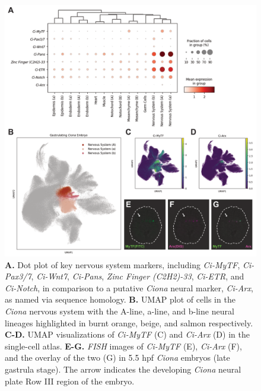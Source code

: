 \begin{figure}[p]
    \centering
    \includegraphics[scale=.7]{4_figures-and-files/Fig3_Arx-Neural-Markers.png}
    \caption[Vertebrate forebrain marker \textit{Arx} found in \textit{Ciona} A-line nervous system lineage]{\textbf{A.} Dot plot of key nervous system markers, including \textit{Ci-MyTF}, \textit{Ci-Pax3/7}, \textit{Ci-Wnt7}, \textit{Ci-Pans}, \textit{Zinc Finger (C2H2)-33}, \textit{Ci-ETR}, and \textit{Ci-Notch}, in comparison to a putative \textit{Ciona} neural marker, \textit{Ci-Arx}, as named via sequence homology. \textbf{B.} UMAP plot of cells in the \textit{Ciona} nervous system with the A-line, a-line, and b-line neural lineages highlighted in burnt orange, beige, and salmon respectively. \textbf{C-D.} UMAP visualizations of \textit{Ci-MyTF} (C) and \textit{Ci-Arx} (D) in the single-cell atlas. \textbf{E-G.} \textit{FISH} images of \textit{Ci-MyTF} (E), \textit{Ci-Arx} (F), and the overlay of the two (G) in 5.5 hpf \textit{Ciona} embryos (late gastrula stage). The arrow indicates the developing \textit{Ciona} neural plate Row III region of the embryo.}
    \label{fig:3 single cell neural markers}
\end{figure}

